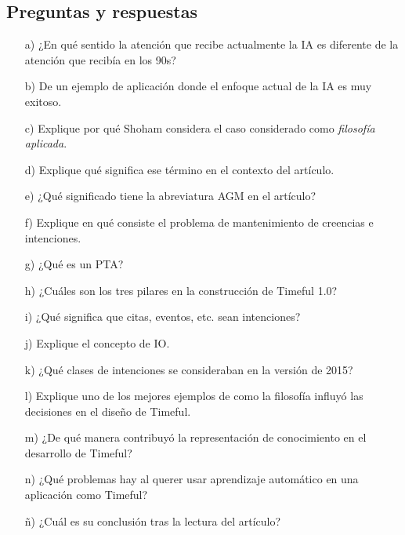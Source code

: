 \documentclass[11pt, letterpaper]{article}
\begin{document}
	\subsection{Preguntas y respuestas}
	\begin{enumerate}
		\item[a)] ¿En qué sentido la atención que recibe actualmente la IA es diferente de la atención que recibía en los 90s?
		
		\item[b)] De un ejemplo de aplicación donde el enfoque actual de la IA es muy exitoso.
		
		
		\item[c)]  Explique por qué Shoham considera el caso considerado como \textit{filosofía aplicada}.
		
		
		\item[d)] Explique qué significa ese término en el contexto del artículo.
		
		
		\item[e)] ¿Qué significado tiene la abreviatura AGM en el artículo?
		
		
		\item[f)]  Explique en qué consiste el problema de mantenimiento de creencias e intenciones.
				
		\item[g)] ¿Qué es un PTA?
				
		\item[h)] ¿Cuáles son los tres pilares en la construcción de Timeful 1.0?
		
		
		\item[i)] ¿Qué significa que citas, eventos, etc. sean intenciones?
		
		\item[j)] Explique el concepto de IO.
				
		\item[k)] ¿Qué clases de intenciones se consideraban en la versión de 2015?
				
		\item[l)] Explique uno de los mejores ejemplos de como la filosofía influyó las decisiones en el diseño de Timeful.
				
		\item[m)]  ¿De qué manera contribuyó la representación de conocimiento en el desarrollo de Timeful?
				
		\item[n)] ¿Qué problemas hay al querer usar aprendizaje automático en una aplicación como Timeful?
				
		\item[ñ)] ¿Cuál es su conclusión tras la lectura del artículo?
		
	\end{enumerate}
			
\end{document}
